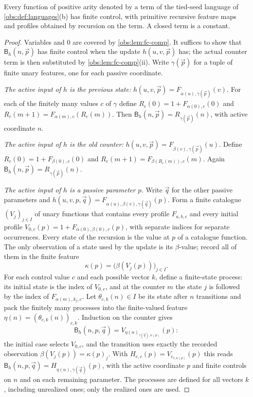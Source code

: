 \begin{theorem}
\label{obs:thm:fc}
Every function of positive arity denoted by a term of the tied-seed language of
\cref{obs:def:languages}(b) has finite control, with primitive recursive
feature maps and profiles obtained by recursion on the term. A closed term is a
constant.
\end{theorem}

\begin{proof}
Variables and $0$ are covered by \cref{obs:lem:fc-comp}. It suffices to show
that $\mathsf{B}_h(n,\vec p)$ has finite control when the update
$h(u,v,\vec p)$ has; the actual counter term is then substituted by
\cref{obs:lem:fc-comp}(ii). Write $\gamma(\vec p)$ for a tuple of finite unary
features, one for each passive coordinate.

\emph{The active input of $h$ is the previous state:}
$h(u,v,\vec p)=F_{\alpha(u),\gamma(\vec p)}(v)$. For each of the finitely many
values $c$ of $\gamma$ define
$R_c(0)=1+F_{\alpha(0),c}(0)$ and $R_c(m+1)=F_{\alpha(m),c}(R_c(m))$. Then
$\mathsf{B}_h(n,\vec p)=R_{\gamma(\vec p)}(n)$, with active coordinate $n$.

\emph{The active input of $h$ is the old counter:}
$h(u,v,\vec p)=F_{\beta(v),\gamma(\vec p)}(u)$. Define
$R_c(0)=1+F_{\beta(0),c}(0)$ and $R_c(m+1)=F_{\beta(R_c(m)),c}(m)$. Again
$\mathsf{B}_h(n,\vec p)=R_{\gamma(\vec p)}(n)$.

\emph{The active input of $h$ is a passive parameter $p$.} Write $\vec q$ for
the other passive parameters and
$h(u,v,p,\vec q)=F_{\alpha(u),\beta(v),\gamma(\vec q)}(p)$. Form a finite
catalogue $(V_j)_{j\in I}$ of unary functions that contains every profile
$F_{a,b,c}$ and every initial profile
$V_{0,c}(p)=1+F_{\alpha(0),\beta(0),c}(p)$, with separate indices for separate
occurrences. Every state of the recursion is the value at $p$ of a catalogue
function. The only observation of a state used by the update is its
$\beta$-value; record all of them in the finite feature
\[
\kappa(p)=\bigl(\beta(V_j(p))\bigr)_{j\in I}.
\]
For each control value $c$ and each possible vector $k$, define a finite-state
process: its initial state is the index of $V_{0,c}$, and at the counter $m$
the state $j$ is followed by the index of $F_{\alpha(m),k_j,c}$. Let
$\theta_{c,k}(n)\in I$ be its state after $n$ transitions and pack the finitely
many processes into the finite-valued feature
$\eta(n)=(\theta_{c,k}(n))_{c,k}$. Induction on the counter gives
\[
\mathsf{B}_h(n,p,\vec q)=V_{\eta(n)_{\gamma(\vec q),\kappa(p)}}(p):
\]
the initial case selects $V_{0,c}$, and the transition uses exactly the
recorded observation $\beta(V_j(p))=\kappa(p)_j$. With
$H_{e,c}(p)=V_{e_{c,\kappa(p)}}(p)$ this reads
$\mathsf{B}_h(n,p,\vec q)=H_{\eta(n),\gamma(\vec q)}(p)$, with the active
coordinate $p$ and finite controls on $n$ and on each remaining parameter. The
processes are defined for all vectors $k$, including unrealized ones; only the
realized ones are used.
\end{proof}

